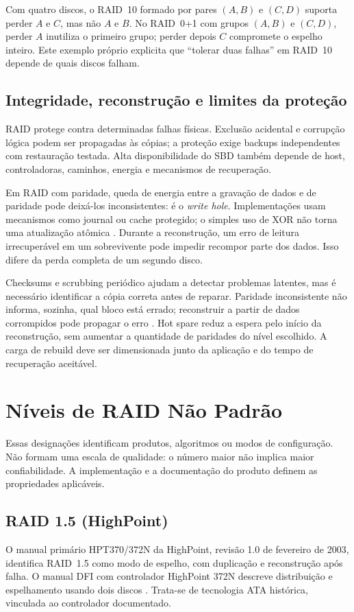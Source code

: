 \documentclass[titlepage]{article}
\begin{document}
Com quatro discos, o RAID~10 formado por pares $(A,B)$ e $(C,D)$ suporta perder $A$ e $C$, mas não $A$ e $B$. No RAID~0+1 com grupos $(A,B)$ e $(C,D)$, perder $A$ inutiliza o primeiro grupo; perder depois $C$ compromete o espelho inteiro. Este exemplo próprio explicita que ``tolerar duas falhas'' em RAID~10 depende de quais discos falham.

\subsection{Integridade, reconstrução e limites da proteção}
RAID protege contra determinadas falhas físicas. Exclusão acidental e corrupção lógica podem ser propagadas às cópias; a proteção exige backups independentes com restauração testada. Alta disponibilidade do SBD também depende de host, controladoras, caminhos, energia e mecanismos de recuperação.

Em RAID com paridade, queda de energia entre a gravação de dados e de paridade pode deixá-los inconsistentes: é o \textit{write hole}. Implementações usam mecanismos como journal ou cache protegido; o simples uso de XOR não torna uma atualização atômica \cite{spdk_raid5f}. Durante a reconstrução, um erro de leitura irrecuperável em um sobrevivente pode impedir recompor parte dos dados. Isso difere da perda completa de um segundo disco.

Checksums e scrubbing periódico ajudam a detectar problemas latentes, mas é necessário identificar a cópia correta antes de reparar. Paridade inconsistente não informa, sozinha, qual bloco está errado; reconstruir a partir de dados corrompidos pode propagar o erro \cite{krioukov2008}. Hot spare reduz a espera pelo início da reconstrução, sem aumentar a quantidade de paridades do nível escolhido. A carga de rebuild deve ser dimensionada junto da aplicação e do tempo de recuperação aceitável.

\section{Níveis de RAID Não Padrão}
\label{sec:raid_nao_padrao}
Essas designações identificam produtos, algoritmos ou modos de configuração. Não formam uma escala de qualidade: o número maior não implica maior confiabilidade. A implementação e a documentação do produto definem as propriedades aplicáveis.

\subsection{RAID 1.5 (HighPoint)}
O manual primário HPT370/372N da HighPoint, revisão 1.0 de fevereiro de 2003, identifica RAID~1.5 como modo de espelho, com duplicação e reconstrução após falha. O manual DFI com controlador HighPoint 372N descreve distribuição e espelhamento usando dois discos \cite{highpoint_15,dfi_15}. Trata-se de tecnologia ATA histórica, vinculada ao controlador documentado.
\end{document}

